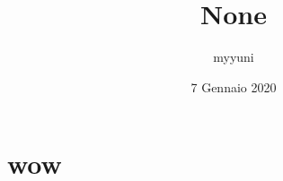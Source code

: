 \documentclass[12pt, a4paper]{article}
\date{7 Gennaio 2020}
\title{None}
\author{myyuni}
\begin{document}
\maketitle

\section{wow}
\end{document}
